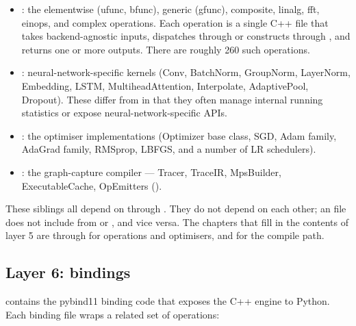 \begin{itemize}
  \item {}: the elementwise (ufunc, bfunc),
    generic (gfunc), composite, linalg, fft, einops, and complex
    operations. Each operation is a single C++ file that takes
    backend-agnostic  inputs, dispatches through
     or constructs through , and
    returns one or more outputs. There are roughly 260 such
    operations.
  \item {}: neural-network-specific kernels
    (Conv, BatchNorm, GroupNorm, LayerNorm, Embedding, LSTM,
    MultiheadAttention, Interpolate, AdaptivePool, Dropout). These
    differ from  in that they often manage internal
    running statistics or expose neural-network-specific APIs.
  \item {}: the optimiser implementations
    (Optimizer base class, SGD, Adam family, AdaGrad family,
    RMSprop, LBFGS, and a number of LR schedulers).
  \item {}: the graph-capture compiler ---
    Tracer, TraceIR, MpsBuilder, ExecutableCache, OpEmitters
    ().
\end{itemize}

These siblings all depend on  through .
They do not depend on each other; an  file does not
include from  or , and vice versa. The
chapters that fill in the contents of layer 5 are
 through  for
operations and optimisers, and  for
the compile path.

\subsection{Layer 6: bindings}
\label{ssec:layered_dag:bindings}

 contains the pybind11 binding code that
exposes the C++ engine to Python. Each binding file wraps a
related set of operations:

